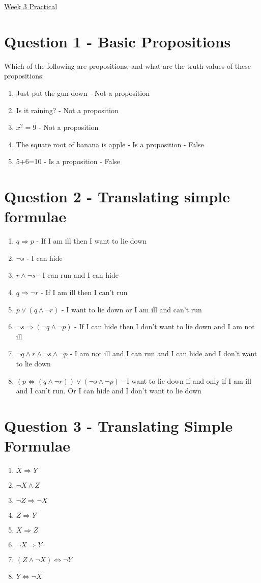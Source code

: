 \documentclass{article}[18pt]
\begin{document}
\begin{center}
\underline{\huge Week 3 Practical}
\end{center}
\section{Question 1 - Basic Propositions}
Which of the following are propositions, and what are the truth values of these propositions:
\begin{enumerate}
\item Just put the gun down - Not a proposition
\item Is it raining? - Not a proposition
\item $x^2=9$ - Not a proposition
\item The square root of banana is apple - Is a proposition - False
\item 5+6=10 - Is a proposition - False
\end{enumerate}
\section{Question 2 - Translating simple formulae}
\begin{enumerate}
\item $q\Rightarrow p$ - If I am ill then I want to lie down
\item $\lnot s$ - I can hide
\item $r \land\lnot s$ - I can run and I can hide
\item $q\Rightarrow \lnot r$ - If I am ill then I can't run
\item $p\lor(q\land\lnot r)$ - I want to lie down or I am ill and can't run
\item $\lnot s \Rightarrow (\lnot q \land \lnot p)$ - If I can hide then I don't want to lie down and I am not ill
\item $\lnot q \land r \land \lnot s \land \lnot p$ - I am not ill and I can run and I can hide and I don't want to lie down
\item $(p \Leftrightarrow (q\land \lnot r))\lor (\lnot s\land \lnot p)$ - I want to lie down if and only if I am ill and I can't run. Or I can hide and I don't want to lie down
\end{enumerate}
\section{Question 3 - Translating Simple Formulae}
\begin{enumerate}
\item $X\Rightarrow Y$
\item $\lnot X \land Z$
\item $\lnot Z \Rightarrow \lnot X$
\item $Z\Rightarrow Y$
\item $X \Rightarrow Z$
\item $\lnot X \Rightarrow Y$
\item $(Z\land \lnot X)\Leftrightarrow \lnot Y $
\item $Y \Leftrightarrow \lnot X$
\end{enumerate}

\end{document}
